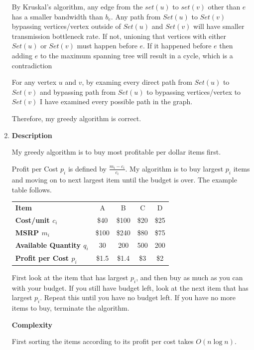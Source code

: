 \documentclass[a4paper,11pt]{article}
\begin{document}
\begin{enumerate}
By Kruskal's algorithm, any edge from the $set(u)$ to $set(v)$ other than $e$ has a smaller bandwidth than $b_e$.
Any path from $Set(u)$ to $Set(v)$ bypassing vertices/vertex outside of $Set(u)$ and $Set(v)$ will have smaller transmission bottleneck rate.
If not, unioning that vertices with either $Set(u)$ or $Set(v)$ must happen before $e$. 
If it happened before $e$ then adding $e$ to the maximum spanning tree will result in a cycle, which is a contradiction

For any vertex $u$ and $v$, by examing every direct path from $Set(u)$ to $Set(v)$ and bypassing path from $Set(u)$ to bypassing vertices/vertex to $Set(v)$ I have examined every possible path in the graph. 

Therefore, my greedy algorithm is correct. 




\item 

{\bf Description}

My greedy algorithm is to buy most profitable per dollar items first.

Profit per Cost $p_i$ is defined by $\frac{m_i-c_i}{c_i}$.
My algorithm is to buy largest $p_i$ items and moving on to next largest item until the budget is over.
The example table follows.


\begin{center}
\begin{tabular}{lcccc}
\bf{Item}               & A     & B                         & C    & D    \\
\bf{Cost/unit $c_i$}          & \$40  & \multicolumn{1}{c}{\$100} & \$20 & \$25 \\
\bf{MSRP} $m_i$               & \$100 & \$240                     & \$80 & \$75 \\
\bf{Available Quantity $q_i$} & 30    & 200                       & 500  & 200  \\
\bf{Profit per Cost $p_i$}  & \$1.5   & \$1.4                       & \$3    & \$2   
\end{tabular}
\end{center}

First look at the item that has largest $p_i$, and then buy as much as you can with your budget. If you still have budget left, look at the next item that has largest $p_i$. Repeat this until you have no budget left. If you have no more items to buy, terminate the algorithm.

{\bf Complexity}

First sorting the items according to its profit per cost takes $O(n\log{}n)$.


\end{enumerate}
\end{document}
